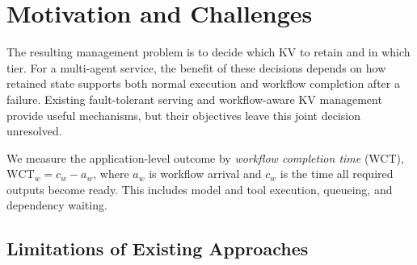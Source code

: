 \section{Motivation and Challenges}
\label{sec:motivation}

The resulting management problem is to decide which KV to retain and
in which tier. For a multi-agent service, the benefit of these decisions
depends on how retained state supports both normal execution and workflow
completion after a failure. Existing fault-tolerant serving and
workflow-aware KV management provide useful mechanisms, but their
objectives leave this joint decision unresolved.

We measure the application-level outcome by \emph{workflow completion
 time} (WCT), $\mathrm{WCT}_w=c_w-a_w$, where $a_w$ is workflow arrival
 and $c_w$ is the time all required outputs become ready. This includes
 model and tool execution, queueing, and dependency waiting.

\subsection{Limitations of Existing Approaches}
\label{sec:motivation-limitations}

